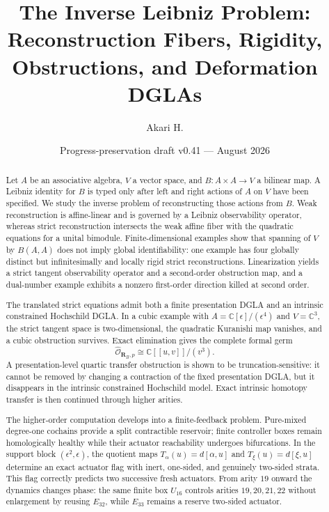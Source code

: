 \documentclass[11pt]{amsart}
\title[The Inverse Leibniz Problem]{The Inverse Leibniz Problem:\\Reconstruction Fibers, Rigidity, Obstructions, and Deformation DGLAs}
\author{Akari H.}
\date{Progress-preservation draft v0.41 --- August 2026}
\newcommand{\cO}{\mathcal O}
\newcommand{\C}{\mathbb C}
\begin{document}
\begin{abstract}
Let $A$ be an associative algebra, $V$ a vector space, and $B:A\times A\to V$ a bilinear map.  A Leibniz identity for $B$ is typed only after left and right actions of $A$ on $V$ have been specified.  We study the inverse problem of reconstructing those actions from $B$.  Weak reconstruction is affine-linear and is governed by a Leibniz observability operator, whereas strict reconstruction intersects the weak affine fiber with the quadratic equations for a unital bimodule.  Finite-dimensional examples show that spanning of $V$ by $B(A,A)$ does not imply global identifiability: one example has four globally distinct but infinitesimally and locally rigid strict reconstructions.  Linearization yields a strict tangent observability operator and a second-order obstruction map, and a dual-number example exhibits a nonzero first-order direction killed at second order.

The translated strict equations admit both a finite presentation DGLA and an intrinsic constrained Hochschild DGLA.  In a cubic example with $A=\C[\epsilon]/(\epsilon^4)$ and $V=\C^3$, the strict tangent space is two-dimensional, the quadratic Kuranishi map vanishes, and a cubic obstruction survives.  Exact elimination gives the complete formal germ
\[
\widehat{\cO}_{\mathbf R_B,p}\cong \C[[u,v]]/(v^3).
\]
A presentation-level quartic transfer obstruction is shown to be truncation-sensitive: it cannot be removed by changing a contraction of the fixed presentation DGLA, but it disappears in the intrinsic constrained Hochschild model.  Exact intrinsic homotopy transfer is then continued through higher arities.

The higher-order computation develops into a finite-feedback problem.  Pure-mixed degree-one cochains provide a split contractible reservoir; finite controller boxes remain homologically healthy while their actuator reachability undergoes bifurcations.  In the support block $(\epsilon^2,\epsilon)$, the quotient maps $T_\alpha(u)=d[\alpha,u]$ and $T_\xi(u)=d[\xi,u]$ determine an exact actuator flag with inert, one-sided, and genuinely two-sided strata.  This flag correctly predicts two successive fresh actuators.  From arity $19$ onward the dynamics changes phase: the same finite box $U_{16}$ controls arities $19,20,21,22$ without enlargement by reusing $E_{32}$, while $E_{33}$ remains a reserve two-sided actuator.


\end{abstract}
\end{document}
